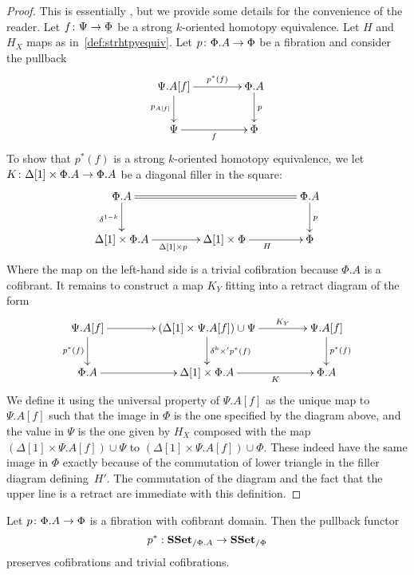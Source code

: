 \documentclass[reqno,10pt,a4paper,oneside,draft]{amsart}
\begin{document}
\begin{proof} This is essentially \cite[Lemma~3.7]{gambino2017frobenius}, but we provide some details
for the convenience of the reader.
Let $f \colon \Psi \rightarrow \Phi$ be a strong $k$-oriented homotopy equivalence. Let $H$ and $H_X$  maps 
as in~\cref{def:strhtpyequiv}. Let $p \colon \Phi.A \rightarrow \Phi$ be a fibration and consider the pullback
\[
\xymatrix@C=1.5cm{
\Psi.A[f] \ar[r]^-{p^*(f)}  \ar[d]_{p_{A[f]}} & \Phi.A \ar[d]^{p} \\
\Psi \ar[r]_{f} & \Phi \\
}
\] 
To show that $p^*(f)$ is a strong $k$-oriented homotopy equivalence, we let $K \colon \Delta[1] \times \Phi.A \rightarrow \Phi.A$ be a diagonal filler in the square:
\[
\xymatrix@C=1.5cm{
\Phi.A \ar[d]_{\delta^{1-k}} \ar@{=}[rr] & & \Phi.A \ar[d]^p \\ 
\Delta[1] \times \Phi.A \ar[r]_{\Delta[1] \times p}  & \Delta[1] \times \Phi \ar[r]_H & \Phi
}\]
Where the map on the left-hand side is a trivial cofibration because $\Phi.A$ is a cofibrant.
It remains to construct a map $K_Y$  fitting into a retract diagram of the form
\[
\xymatrix@C=1.5cm{
\Psi.A[f]  \ar[d]_{p^*(f)} \ar[r] &  (\Delta[1] \times \Psi.A[f])  \cup \Psi \ar[d]^{\delta^k \times' p^*(f)} \ar[r]^-{K_Y} & \Psi.A[f] \ar[d]^{p^*(f)} \\
\Phi.A \ar[r] & \Delta[1]  \times \Phi.A \ar[r]_-{K} & \Phi.A
}
\]
We define it using the universal property of $\Psi.A[f]$ as the unique map to $\Psi.A[f]$ such that the image in $\Phi$ is the one specified by the diagram above, and the value in $\Psi$ is the one given by $H_X$ composed with the map $(\Delta[1] \times \Psi.A[f]) \cup \Psi$ to $(\Delta[1] \times \Psi.A[f]) \cup \Phi$. These indeed have the same image in $\Phi$ exactly because of the commutation of lower triangle in the filler diagram defining~$H'$. The commutation of the diagram and the fact that the upper line is a retract are immediate with this definition.
\end{proof}



\begin{proposition}\label{prop:Frobenius}
Let $p \colon \Phi.A \rightarrow \Phi$ is a fibration with cofibrant domain. Then the pullback functor 
\[
p^* : \mathbf{SSet}_{/\Phi.A} \rightarrow \mathbf{SSet}_{/\Phi}
\] 
preserves cofibrations and trivial cofibrations.
\end{proposition}
\end{document}
